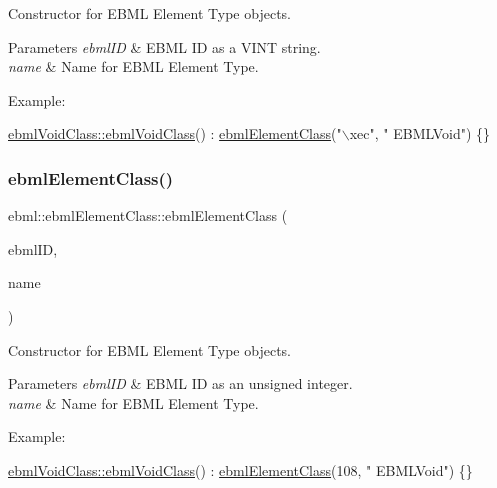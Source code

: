 Constructor for E\+B\+ML Element Type objects.


\begin{DoxyParams}{Parameters}
{\em ebml\+ID} & E\+B\+ML ID as a V\+I\+NT string. \\
\hline
{\em name} & Name for E\+B\+ML Element Type.\\
\hline
\end{DoxyParams}
Example\+: 
\begin{DoxyCode}
\mbox{\hyperlink{classebml_1_1ebmlVoidClass_afc8666d6bbcd41bad76bfc5a2b5b4c9a}{ebmlVoidClass::ebmlVoidClass}}() : \mbox{\hyperlink{classebml_1_1ebmlElementClass_a6c2081870c5d66c70e0cf988ff253420}{ebmlElementClass}}(\textcolor{stringliteral}{"\(\backslash\)xec"}, \textcolor{stringliteral}{"
      EBMLVoid"}) \{\}
\end{DoxyCode}
 \mbox{\label{classebml_1_1ebmlElementClass_a9ea21779aa5db15a70df73a03a873aa8}} 
\subsubsection{\texorpdfstring{ebml\+Element\+Class()}{ebmlElementClass()}\hspace{0.1cm}{\footnotesize\ttfamily [2/2]}}
{\footnotesize\ttfamily ebml\+::ebml\+Element\+Class\+::ebml\+Element\+Class (\begin{DoxyParamCaption}\item[{\mbox{\hyperlink{namespaceebml_a86c5f604ddf12a74aa9812e997a58691}{ebml\+I\+D\+\_\+t}}}]{ebml\+ID,  }\item[{const std\+::wstring \&}]{name }\end{DoxyParamCaption})}

Constructor for E\+B\+ML Element Type objects.


\begin{DoxyParams}{Parameters}
{\em ebml\+ID} & E\+B\+ML ID as an unsigned integer. \\
\hline
{\em name} & Name for E\+B\+ML Element Type.\\
\hline
\end{DoxyParams}
Example\+: 
\begin{DoxyCode}
\mbox{\hyperlink{classebml_1_1ebmlVoidClass_afc8666d6bbcd41bad76bfc5a2b5b4c9a}{ebmlVoidClass::ebmlVoidClass}}() : \mbox{\hyperlink{classebml_1_1ebmlElementClass_a6c2081870c5d66c70e0cf988ff253420}{ebmlElementClass}}(108, \textcolor{stringliteral}{"
      EBMLVoid"}) \{\}
\end{DoxyCode}
 


